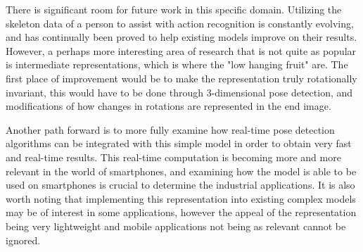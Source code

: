 There is significant room for future work in this specific domain. Utilizing the skeleton data of a person to assist with action recognition is constantly evolving, and has continually been proved to help existing models improve on their results. However, a perhaps more interesting area of research that is not quite as popular is intermediate representations, which is where the "low hanging fruit" are. The first place  of improvement would be to make the representation truly rotationally invariant, this would have to be done through 3-dimensional pose detection, and modifications of how changes in rotations are represented in the end image. 

Another path forward is to more fully examine how real-time pose detection algorithms can be integrated with this simple model in order to obtain very fast and real-time results. This real-time computation is becoming more and more relevant in the world of smartphones, and examining how the model is able to be used on smartphones is crucial to determine the industrial applications. It is also worth noting that implementing this representation into existing complex models may be of interest in some applications, however the appeal of the representation being very lightweight and mobile applications not being as relevant cannot be ignored.
